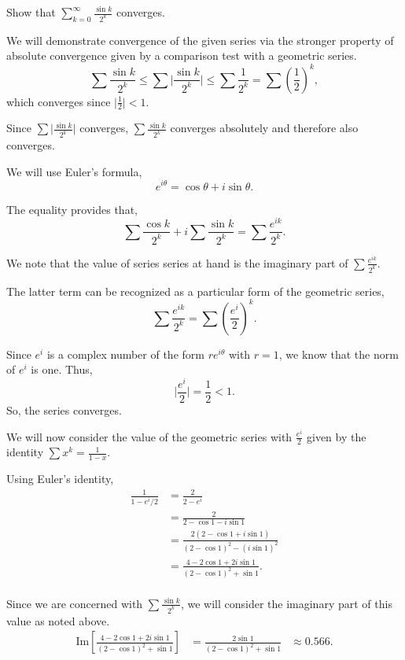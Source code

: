 \documentclass[../hw4]{subfiles}
\begin{document}
Show that $\sum_{k=0}^{\infty}\frac{\sin{k}}{2^k}$ converges.

We will demonstrate convergence of the given series via the stronger property of absolute convergence given by a comparison test with a geometric series. 
\[\sum\frac{\sin{k}}{2^k}\leq\sum\Bigg|\frac{\sin{k}}{2^k}\Bigg|\leq\sum\frac{1}{2^k}=\sum{\left( \frac{1}{2} \right)}^k,\] which converges since $\big|\frac{1}{2}\big|<1$.

Since $\sum\Big|\frac{\sin{k}}{2^k}\Big|$ converges, $\sum\frac{\sin{k}}{2^k}$ converges absolutely and therefore also converges.

We will use Euler's formula, \[e^{i\theta}=\cos{\theta}+i\sin{\theta}.\]

The equality provides that, \[\sum\frac{\cos{k}}{2^k}+i\sum\frac{\sin{k}}{2^k}=\sum\frac{e^{ik}}{2^k}.\]

We note that the value of series series at hand is the imaginary part of $\sum\frac{e^{ik}}{2^k}$.

The latter term can be recognized as a particular form of the geometric series,
\[\sum\frac{e^{ik}}{2^k}=\sum{\left( \frac{e^i}{2} \right)}^k.\]

Since $e^i$ is a complex number of the form $re^{i\theta}$ with $r=1$, we know that the norm of $e^i$ is one. Thus, \[\Bigg|\frac{e^i}{2}\Bigg|=\frac{1}{2}<1.\]
So, the series converges. 

We will now consider the value of the geometric series with $\frac{e^i}{2}$ given by the identity $\sum x^k = \frac{1}{1-x}$.

Using Euler's identity,
\begin{align*}
    \frac{1}{1-e^i/2} &= \frac{2}{2-e^i} \\
    &= \frac{2}{2-\cos{1}-i\sin{1}} \\
    &= \frac{2(2-\cos{1}+i\sin{1})}{{(2-\cos{1})}^2-{(i\sin{1})}^2} \\
    &= \frac{4-2\cos{1}+2i\sin{1}}{{(2-\cos{1})}^2+\sin{1}}. \\
\end{align*}

Since we are concerned with $\sum\frac{\sin{k}}{2^k}$, we will consider the imaginary part of this value as noted above.
\begin{align*}
    \text{Im}\left[ \frac{4-2\cos{1}+2i\sin{1}}{{(2-\cos{1})}^2+\sin{1}} \right] &= \frac{2\sin{1}}{{(2-\cos{1})}^2+\sin{1}}
    &\approx 0.566.
\end{align*}
\end{document}
